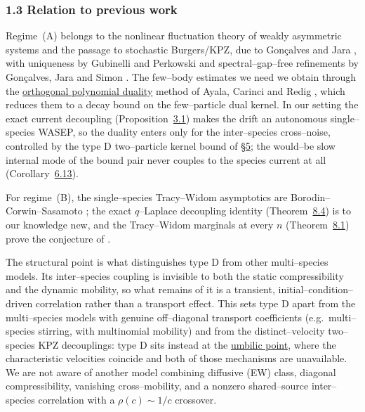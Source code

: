 \documentclass[11pt]{article}
\theoremstyle{plain}
\theoremstyle{definition}
\theoremstyle{remark}
\begin{document}
\subsubsection{1.3 Relation to previous work}\label{sec_introlit}
Regime~(A) belongs to the nonlinear fluctuation theory of weakly asymmetric systems and
the passage to stochastic Burgers/KPZ, due to Gon\c{c}alves and Jara \cite{GJ}, with
uniqueness by Gubinelli and Perkowski \cite{GP} and spectral--gap--free refinements by
Gon\c{c}alves, Jara and Simon \cite{GJS}. The few--body estimates we need we obtain
through the \underline{orthogonal polynomial duality} method of Ayala, Carinci and Redig
\cite{ACR,ACR2}, which reduces them to a decay bound on the few--particle dual kernel. In
our setting the exact current decoupling (Proposition~\hyperref[prop_decouple]{3.1}) makes the
drift an autonomous single--species WASEP, so the duality enters only for the
inter--species cross--noise, controlled by the type D two--particle kernel bound of
\S\hyperref[sec_kernel]{5}; the would--be slow internal mode of the bound pair never couples to
the species current at all (Corollary~\hyperref[prop_sym]{6.13}).

For regime~(B), the single--species Tracy--Widom asymptotics are
Borodin--Corwin--Sasamoto \cite{BCS}; the exact $q$--Laplace decoupling identity
(Theorem~\hyperref[thm_cov]{8.4}) is to our knowledge new, and the Tracy--Widom marginals at
every $n$ (Theorem~\hyperref[thm_marg]{8.1}) prove the conjecture of \cite[\S3.1.1]{REU}.

The structural point is what distinguishes type D from other multi--species models. Its
inter--species coupling is invisible to both the static compressibility and the dynamic
mobility, so what remains of it is a transient, initial--condition--driven correlation
rather than a transport effect. This sets type D apart from the multi--species models
with genuine off--diagonal transport coefficients (e.g.\ multi--species stirring, with
multinomial mobility) and from the distinct--velocity two--species KPZ decouplings:
type D sits instead at the \underline{umbilic point}, where the characteristic velocities
coincide and both of those mechanisms are unavailable. We are not aware of another
model combining diffusive (EW) class, diagonal compressibility, vanishing
cross--mobility, and a nonzero shared--source inter--species correlation with a
$\rho(c)\sim1/c$ crossover.
\end{document}
